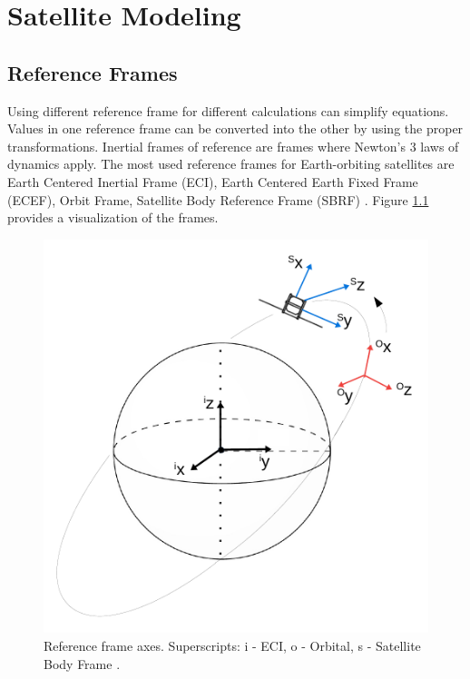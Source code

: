 \chapter{Satellite Modeling}
\section{Reference Frames}


Using different reference frame for different calculations can simplify equations. Values in one reference frame can be converted into the other by using the proper transformations.
Inertial frames of reference are frames where Newton's 3 laws of dynamics apply.
The most used reference frames for Earth-orbiting satellites are Earth Centered Inertial Frame (ECI), Earth Centered Earth Fixed Frame (ECEF), Orbit Frame, Satellite Body Reference Frame (SBRF)  \cite{ref1} \cite{ref2}. Figure \ref{fig:frames} provides a visualization of the frames.

\begin{figure}[h!]
	\centering 
	\includegraphics[width=140mm]{figures/frame.pdf}	
	\caption{Reference frame axes. Superscripts: i - ECI, o - Orbital, s - Satellite Body Frame \cite{our_report}.}
	\label{fig:frames}
\end{figure}

